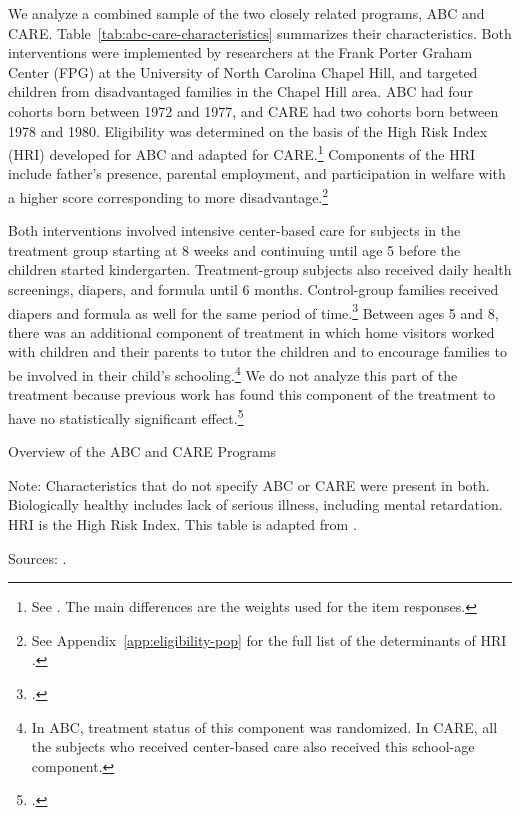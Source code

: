 We analyze a combined sample of the two closely related programs, ABC and CARE. Table~\ref{tab:abc-care-characteristics} summarizes their characteristics. Both interventions were implemented by researchers at the Frank Porter Graham Center (FPG) at the University of North Carolina Chapel Hill, and targeted children from disadvantaged families in the Chapel Hill area. ABC had four cohorts born between 1972 and 1977, and CARE had two cohorts born between 1978 and 1980. Eligibility was determined on the basis of the High Risk Index (HRI) developed for ABC and adapted for CARE.\footnote{See \citet{Campbell_Wasik_etal_2008_ECRQ}. The main differences are the weights used for the item responses.} Components of the HRI include father's presence, parental employment, and participation in welfare with a higher score corresponding to more disadvantage.\footnote{See Appendix~\ref{app:eligibility-pop} for the full list of the determinants of HRI \citep{Ramey_Smith_1977_AJMD, Wasik_Ramey_etal_1990_CD, Ramey_Campbell_1991_childreninpoverty}.}

Both interventions involved intensive center-based care for subjects in the treatment group starting at 8 weeks and continuing until age 5 before the children started kindergarten. Treatment-group subjects also received daily health screenings, diapers, and formula until 6 months. Control-group families received diapers and formula as well for the same period of time.\footnote{\citet{Wasik_Ramey_etal_1990_CD,Ramey_Campbell_1991_childreninpoverty}.}  Between ages 5 and 8, there was an additional component of treatment in which home visitors worked with children and their parents to tutor the children and to encourage families to be involved in their child's schooling.\footnote{In ABC, treatment status of this component was randomized. In CARE, all the subjects who received center-based care also received this school-age component.} We do not analyze this part of the treatment because previous work has found this component of the treatment to have no statistically significant effect.\footnote{\citet{Campbell_Ramey_etal_2002_ADS,Campbell_Conti_etal_2014_EarlyChildhoodInvestments}.}

\begin{table}[H]
\centering
\caption{Overview of the ABC and CARE Programs}
\label{tab:abc-care-characteristics}
\begin{threeparttable}
	
\begin{tablenotes}
\footnotesize
\item Note: Characteristics that do not specify ABC or CARE were present in both. Biologically healthy includes lack of serious illness, including mental retardation. HRI is the High Risk Index. This table is adapted from \citet{Elango_Hojman_etal_2016_Early-Edu}. \\
\item Sources: \citet{Ramey_Collier_etal_1976_CarolinaAbecedarianProject,Ramey_Smith_1977_AJMD,Ramey_etal_1985_Project-CARE_TiECSE,Wasik_Ramey_etal_1990_CD,Ramey_Campbell_1991_childreninpoverty}. 
\end{tablenotes}
\end{threeparttable}
\end{table}

